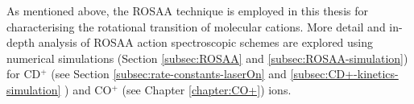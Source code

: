 As mentioned above, the ROSAA technique is employed in this thesis for
characterising the rotational transition of molecular cations. More detail and
in-depth analysis of ROSAA action spectroscopic schemes are explored using
numerical simulations (Section \ref{subsec:ROSAA} and
\ref{subsec:ROSAA-simulation}) for CD$^+$ (see Section
\ref{subsec:rate-constants-laserOn} and \ref{subsec:CD+-kinetics-simulation} )
and CO$^+$ (see Chapter \ref{chapter:CO+}) ions.


